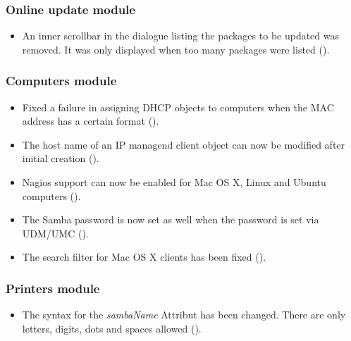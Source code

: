 \subsubsection{Online update module}
\begin{itemize}
\item An inner scrollbar in the dialogue listing the packages to be
  updated was removed. It was only displayed when too many packages
  were listed ().
\end{itemize}


\subsubsection{Computers module}
\begin{itemize}
\item Fixed a failure in assigning DHCP objects to computers when the
  MAC address has a certain format ().

\item The host name of an IP managend client object can now be
  modified after initial creation ().

\item Nagios support can now be enabled for Mac OS X, Linux and Ubuntu
  computers ().

\item The Samba password is now set as well when the password is set
  via UDM/UMC ().

\item The search filter for Mac OS X clients has been fixed
  ().
\end{itemize}


\subsubsection{Printers module}
\begin{itemize}
\item The syntax for the \emph{sambaName} Attribut has been changed. There
  are only letters, digits, dots and spaces allowed ().
\end{itemize}

